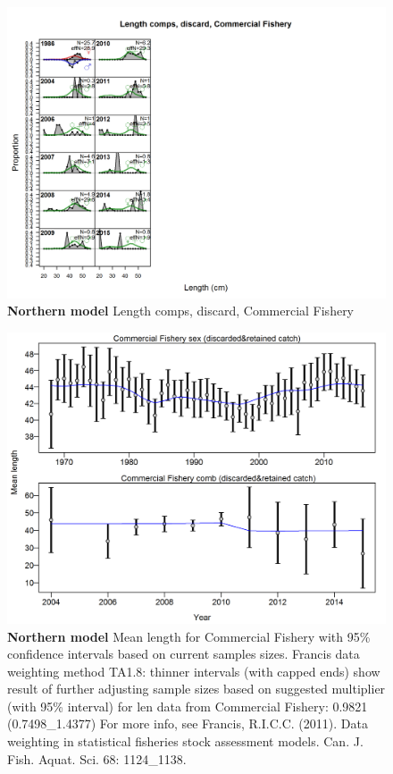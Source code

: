 \documentclass[12pt,]{article}
\begin{document}
\begin{figure}[htbp]
\centering
\includegraphics{./r4ss/plots_mod1/comp_lenfit_flt1mkt1.png}
\caption{\textbf{Northern model} Length comps, discard, Commercial
Fishery \label{fig:mod1_6_comp_lenfit_flt1mkt1}}
\end{figure}

\begin{figure}[htbp]
\centering
\includegraphics{./r4ss/plots_mod1/comp_lenfit_data_weighting_TA1.8_Commercial Fishery.png}
\caption{\textbf{Northern model} Mean length for Commercial Fishery with
95\% confidence intervals based on current samples sizes. Francis data
weighting method TA1.8: thinner intervals (with capped ends) show result
of further adjusting sample sizes based on suggested multiplier (with
95\% interval) for len data from Commercial Fishery: 0.9821
(0.7498\_1.4377) For more info, see Francis, R.I.C.C. (2011). Data
weighting in statistical fisheries stock assessment models. Can. J.
Fish. Aquat. Sci. 68: 1124\_1138.
\label{fig:mod1_9_comp_lenfit_data_weighting_TA1.8_Commercial Fishery}}
\end{figure}
\end{document}
